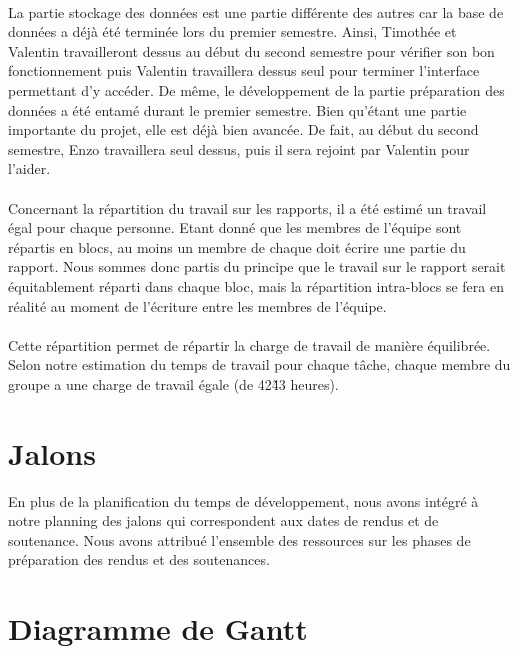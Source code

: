 \paragraph{}

La partie stockage des données est une partie différente des autres car la base de données a déjà été terminée lors du premier semestre. Ainsi, Timothée et Valentin travailleront dessus au début du second semestre pour vérifier son bon fonctionnement puis Valentin travaillera dessus seul pour terminer l’interface permettant d’y accéder. De même, le développement de la partie préparation des données a été entamé durant le premier semestre. Bien qu’étant une partie importante du projet, elle est déjà bien avancée. De fait, au début du second semestre, Enzo travaillera seul dessus, puis il sera rejoint par Valentin pour l’aider.

\paragraph{}

Concernant la répartition du travail sur les rapports, il a été estimé un travail égal pour chaque personne. Etant donné que les membres de l’équipe sont répartis en blocs, au moins un membre de chaque doit écrire une partie du rapport. Nous sommes donc partis du principe que le travail sur le rapport serait équitablement réparti dans chaque bloc, mais la répartition intra-blocs se fera en réalité au moment de l’écriture entre les membres de l’équipe.

\paragraph{}

Cette répartition permet de répartir la charge de travail de manière équilibrée. Selon notre estimation du temps de travail pour chaque tâche, chaque membre du groupe a une charge de travail égale (de 42\~43 heures).

\section{Jalons}

En plus de la planification du temps de développement, nous avons intégré à notre planning des jalons qui correspondent aux dates de rendus et de soutenance. Nous avons attribué l’ensemble des ressources sur les phases de préparation des rendus et des soutenances.

\section{Diagramme de Gantt}

